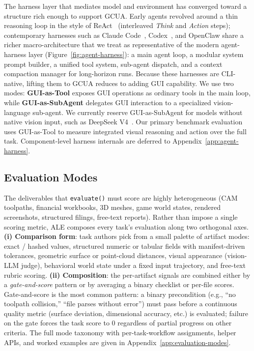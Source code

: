 The harness layer that mediates model and environment has converged toward a structure rich enough to support GCUA. Early agents revolved around a thin reasoning loop in the style of ReAct~\citep{yao2023react} (interleaved \textit{Think} and \textit{Action} steps); contemporary harnesses such as Claude Code~\citep{anthropic2025claudecode}, Codex~\citep{openai2025codex}, and OpenClaw share a richer macro-architecture that we treat as representative of the modern agent-harness layer (Figure~\ref{fig:agent-harness}): a main agent loop, a modular system prompt builder, a unified tool system, sub-agent dispatch, and a context compaction manager for long-horizon runs. Because these harnesses are CLI-native, lifting them to GCUA reduces to adding GUI capability. We use two modes: \textbf{GUI-as-Tool} exposes GUI operations as ordinary tools in the main loop, while \textbf{GUI-as-SubAgent} delegates GUI interaction to a specialized vision-language sub-agent. We currently reserve GUI-as-SubAgent for models without native vision input, such as DeepSeek V4~\citep{deepseek2026v4pro}. Our primary benchmark evaluation uses GUI-as-Tool to measure integrated visual reasoning and action over the full task. Component-level harness internals are deferred to Appendix~\ref{app:agent-harness}.

\vspace{-0.6em}
\subsection{Evaluation Modes}
\label{sec:evaluation-modes}
\vspace{-0.4em}
The deliverables that \texttt{evaluate()} must score are highly heterogeneous (CAM toolpaths, financial workbooks, 3D meshes, game world states, rendered screenshots, structured filings, free-text reports). Rather than impose a single scoring metric, ALE composes every task's evaluation along two orthogonal axes. \textbf{(i) Comparison form}: task authors pick from a small palette of artifact modes: exact / hashed values, structured numeric or tabular fields with manifest-driven tolerances, geometric surface or point-cloud distances, visual appearance (vision-LLM judge), behavioral world state under a fixed input trajectory, and free-text rubric scoring. \textbf{(ii) Composition}: the per-artifact signals are combined either by a \emph{gate-and-score} pattern or by averaging a binary checklist or per-file scores. Gate-and-score is the most common pattern: a binary precondition (e.g., ``no toolpath collision,'' ``file parses without error'') must pass before a continuous quality metric (surface deviation, dimensional accuracy, etc.) is evaluated; failure on the gate forces the task score to $0$ regardless of partial progress on other criteria. The full mode taxonomy with per-task-workflow assignments, helper APIs, and worked examples are given in Appendix~\ref{app:evaluation-modes}.

